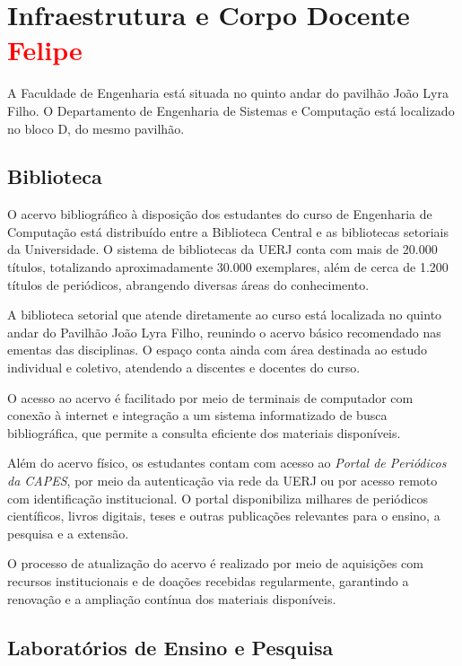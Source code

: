 \chapter{Infraestrutura e Corpo Docente \textcolor{red}{Felipe}}

A Faculdade de Engenharia está situada no quinto andar do pavilhão João Lyra Filho. O Departamento de Engenharia de Sistemas e Computação está localizado no bloco D, do mesmo pavilhão.

\section{Biblioteca}
O acervo bibliográfico à disposição dos estudantes do curso de Engenharia de Computação está distribuído entre a Biblioteca Central e as bibliotecas setoriais da Universidade. O sistema de bibliotecas da UERJ conta com mais de 20.000 títulos, totalizando aproximadamente 30.000 exemplares, além de cerca de 1.200 títulos de periódicos, abrangendo diversas áreas do conhecimento.

A biblioteca setorial que atende diretamente ao curso está localizada no quinto andar do Pavilhão João Lyra Filho, reunindo o acervo básico recomendado nas ementas das disciplinas. O espaço conta ainda com área destinada ao estudo individual e coletivo, atendendo a discentes e docentes do curso.

O acesso ao acervo é facilitado por meio de terminais de computador com conexão à internet e integração a um sistema informatizado de busca bibliográfica, que permite a consulta eficiente dos materiais disponíveis.

Além do acervo físico, os estudantes contam com acesso ao \textit{Portal de Periódicos da CAPES}, por meio da autenticação via rede da UERJ ou por acesso remoto com identificação institucional. O portal disponibiliza milhares de periódicos científicos, livros digitais, teses e outras publicações relevantes para o ensino, a pesquisa e a extensão.

O processo de atualização do acervo é realizado por meio de aquisições com recursos institucionais e de doações recebidas regularmente, garantindo a renovação e a ampliação contínua dos materiais disponíveis.


\section{Laboratórios de Ensino e Pesquisa}

